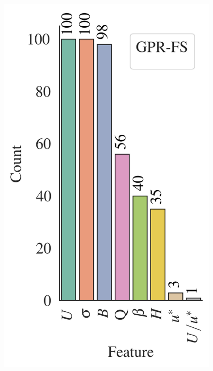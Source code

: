 \documentclass[a4paper,12pt, english]{article}
\begin{document}
\begin{figure}[!]
    \centering 
    \includegraphics[height=0.35\textheight]{./results/eml____300dpi_active_features_distribution_gpr_fs__count}

\end{figure}
\end{document}
